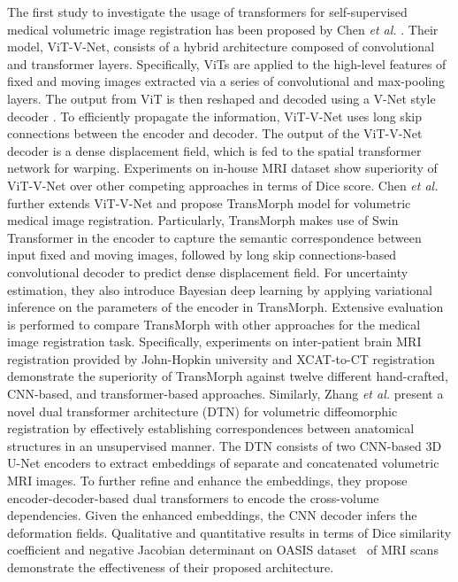 \documentclass[10pt,journal,compsoc]{IEEEtran}
\begin{document}
The first study to investigate the usage of transformers for self-supervised medical volumetric image registration has been proposed by Chen \textit{et al.} \cite{chen2021vit}. Their model, ViT-V-Net, consists of a hybrid architecture composed of convolutional and transformer layers. Specifically, ViTs are applied to the high-level features of fixed and moving images extracted via a series of convolutional and max-pooling layers. The output from ViT is then reshaped and decoded using a V-Net style decoder \cite{milletari2018v}. To efficiently propagate the information, ViT-V-Net uses long skip connections between the encoder and decoder. The output of the ViT-V-Net decoder is a dense displacement field, which is fed to the spatial transformer network for warping. Experiments on in-house MRI dataset show superiority of ViT-V-Net over other competing approaches in terms of Dice score. %
Chen \textit{et al.}~\cite{chen2021transmorph} further extends ViT-V-Net  and propose TransMorph model for volumetric medical image registration. Particularly, TransMorph makes use of Swin Transformer in the encoder to capture the semantic correspondence between input fixed and moving images, followed by long skip connections-based convolutional decoder to predict dense displacement field. For uncertainty estimation, they also introduce Bayesian deep learning by applying variational inference on the parameters of the encoder in TransMorph. Extensive evaluation is performed to compare TransMorph with other approaches for the medical image registration task. Specifically, experiments on inter-patient brain MRI registration provided by John-Hopkin university and XCAT-to-CT registration demonstrate the superiority of TransMorph against twelve different hand-crafted, CNN-based, and transformer-based approaches.
Similarly, Zhang \textit{et al.} \cite{zhang2021learning} present a novel dual transformer architecture (DTN) for volumetric diffeomorphic registration by effectively establishing correspondences between anatomical structures in an unsupervised manner.
The DTN consists of two CNN-based 3D U-Net encoders to extract embeddings of separate and concatenated volumetric MRI images. To further refine and enhance the embeddings, they propose encoder-decoder-based dual transformers to encode the cross-volume dependencies. Given the enhanced embeddings, the CNN decoder infers the deformation fields. Qualitative and quantitative results in terms of Dice similarity coefficient and negative Jacobian determinant on OASIS dataset~\cite{marcus2007open} of MRI scans demonstrate the effectiveness of their proposed architecture.
\end{document}
